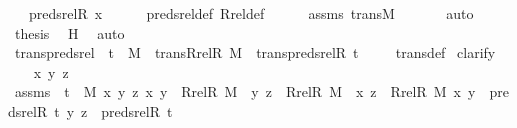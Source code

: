 \begin{isabellebody}
\ {\isachardoublequoteopen}{\isachardot}{\kern0pt}{\isachardot}{\kern0pt}{\isachardot}{\kern0pt}\ {\isacharequal}{\kern0pt}\ preds{\isacharunderscore}{\kern0pt}rel{\isacharparenleft}{\kern0pt}R{\isacharcomma}{\kern0pt}\ x{\isacharparenright}{\kern0pt}{\isachardoublequoteclose}\isanewline
\ \ \ \ \isamarkupfalse%
\ preds{\isacharunderscore}{\kern0pt}rel{\isacharunderscore}{\kern0pt}def\ Rrel{\isacharunderscore}{\kern0pt}def\isanewline
\ \ \ \ \isamarkupfalse%
\ assms\ transM\ \isanewline
\ \ \ \ \isamarkupfalse%
\ auto\isanewline
\isanewline
\ \ \isamarkupfalse%
\ \isamarkupfalse%
\ {\isacharquery}{\kern0pt}thesis\ \isamarkupfalse%
\ H\ \isamarkupfalse%
\ auto\isanewline
{}\isamarkupfalse%
%
\endisatagproof
{\isafoldproof}%
%
\isadelimproof
\isanewline
%
\endisadelimproof
\ \ \ \isanewline
{}\isamarkupfalse%
\ trans{\isacharunderscore}{\kern0pt}preds{\isacharunderscore}{\kern0pt}rel\ {\isacharcolon}{\kern0pt}\ {\isachardoublequoteopen}t\ {\isasymin}\ M\ {\isasymLongrightarrow}\ trans{\isacharparenleft}{\kern0pt}Rrel{\isacharparenleft}{\kern0pt}R{\isacharcomma}{\kern0pt}\ M{\isacharparenright}{\kern0pt}{\isacharparenright}{\kern0pt}\ {\isasymLongrightarrow}\ trans{\isacharparenleft}{\kern0pt}preds{\isacharunderscore}{\kern0pt}rel{\isacharparenleft}{\kern0pt}R{\isacharcomma}{\kern0pt}\ t{\isacharparenright}{\kern0pt}{\isacharparenright}{\kern0pt}{\isachardoublequoteclose}\ \isanewline
%
\isadelimproof
\ \ %
\endisadelimproof
%
\isatagproof
{}\isamarkupfalse%
\ trans{\isacharunderscore}{\kern0pt}def\ \isanewline
{}\isamarkupfalse%
{\isacharparenleft}{\kern0pt}clarify{\isacharparenright}{\kern0pt}\isanewline
\ \ \isamarkupfalse%
\ x\ y\ z\ \isamarkupfalse%
\ assms\ {\isacharcolon}{\kern0pt}\ {\isachardoublequoteopen}t\ {\isasymin}\ M{\isachardoublequoteclose}\ {\isachardoublequoteopen}{\isasymforall}x\ y\ z{\isachardot}{\kern0pt}\ {\isasymlangle}x{\isacharcomma}{\kern0pt}\ y{\isasymrangle}\ {\isasymin}\ Rrel{\isacharparenleft}{\kern0pt}R{\isacharcomma}{\kern0pt}\ M{\isacharparenright}{\kern0pt}\ {\isasymlongrightarrow}\ {\isasymlangle}y{\isacharcomma}{\kern0pt}\ z{\isasymrangle}\ {\isasymin}\ Rrel{\isacharparenleft}{\kern0pt}R{\isacharcomma}{\kern0pt}\ M{\isacharparenright}{\kern0pt}\ {\isasymlongrightarrow}\ {\isasymlangle}x{\isacharcomma}{\kern0pt}\ z{\isasymrangle}\ {\isasymin}\ Rrel{\isacharparenleft}{\kern0pt}R{\isacharcomma}{\kern0pt}\ M{\isacharparenright}{\kern0pt}{\isachardoublequoteclose}\ {\isachardoublequoteopen}{\isacharless}{\kern0pt}x{\isacharcomma}{\kern0pt}\ y{\isachargreater}{\kern0pt}\ {\isasymin}\ preds{\isacharunderscore}{\kern0pt}rel{\isacharparenleft}{\kern0pt}R{\isacharcomma}{\kern0pt}\ t{\isacharparenright}{\kern0pt}{\isachardoublequoteclose}\ {\isachardoublequoteopen}{\isacharless}{\kern0pt}y{\isacharcomma}{\kern0pt}\ z{\isachargreater}{\kern0pt}\ {\isasymin}\ preds{\isacharunderscore}{\kern0pt}rel{\isacharparenleft}{\kern0pt}R{\isacharcomma}{\kern0pt}\ t{\isacharparenright}{\kern0pt}{\isachardoublequoteclose}\ \isanewline

\end{isabellebody}
